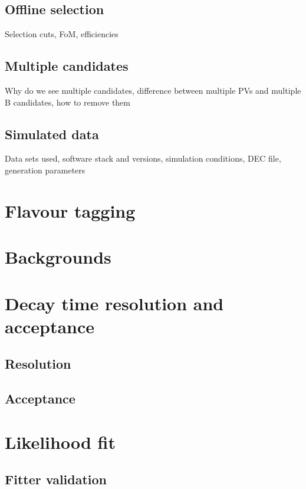 \subsection{Offline selection}
\label{sec:measurement_of_sin2beta:data_preparation:offline_selection}
Selection cuts, FoM, efficiencies

\subsection{Multiple candidates}
Why do we see multiple candidates, difference between multiple PVs and multiple B candidates, how to remove them

\subsection{Simulated data}
Data sets used, software stack and versions, simulation conditions, DEC file, generation parameters

\section{Flavour tagging}
\label{sec:measurement_of_sin2beta:flavour_tagging}
\section{Backgrounds}
\label{sec:measurement_of_sin2beta:physic_backgrounds}
\section{Decay time resolution and acceptance}
\label{sec:measurement_of_sin2beta:resolution_and_acceptance}
\subsection{Resolution}
\label{sec:measurement_of_sin2beta:resolution_and_acceptance:resolution}
\subsection{Acceptance}
\label{sec:measurement_of_sin2beta:resolution_and_acceptance:acceptance}
\section{Likelihood fit}
\subsection{Fitter validation}
